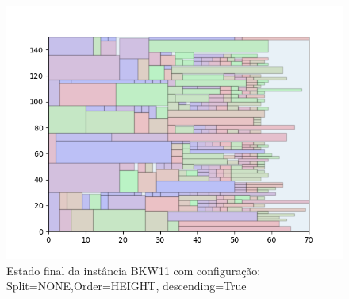 \begin{figure}[H]
    \centering
    \caption[]{Estado final da instância BKW11 com configuração: Split=NONE,Order=HEIGHT, descending=True}
    \label{fig:bkw11-none-height-true}
    \includegraphics[scale=0.5]{output/figures/bkw/bkw11/none/height/true/000}
\end{figure}